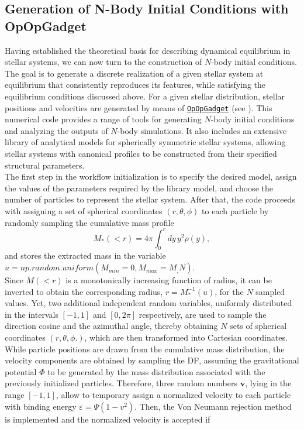 \documentclass[12pt,twoside,openany]{book}
\begin{document}
\subsection{Generation of N-Body Initial Conditions with OpOpGadget}
\label{subsec:Generation of N-Body ICs with OpOpGadget}
Having established the theoretical basis for describing dynamical equilibrium in stellar systems, we can now turn to the construction of $N$-body initial conditions. The goal is to generate a discrete realization of a given stellar system at equilibrium that consistently reproduces its features, while satisfying the equilibrium conditions discussed above. For a given stellar distribution, stellar positions and velocities are generated by means of \href{https://github.com/giulianoiorio/OpOpGadget}{\texttt{OpOpGadget}} (see \citealt{Iorio_2019}). This numerical code provides a range of tools for generating $N$-body initial conditions and analyzing the outputs of $N$-body simulations. It also includes an extensive library of analytical models for spherically symmetric stellar systems, allowing stellar systems with canonical profiles to be constructed from their specified structural parameters.\\The first step in the workflow initialization is to specify the desired model, assign the values of the parameters required by the library model, and choose the number of particles to represent the stellar system. After that, the code proceeds with assigning a set of spherical coordinates $(r,\theta,\phi)$ to each particle by randomly sampling the cumulative mass profile
\begin{equation}\label{cumulative mass formula}
 M_*(<r)=4\pi\int_0^{r}dy\,y^2\rho(y),
\end{equation}
and stores the extracted mass in the variable $u=np.random.uniform(M_{min}=0, M_{max}=M_, N)$.\\Since $M(<r)$ is a monotonically increasing function of radius, it can be inverted to obtain the corresponding radius, $r=M_*^{-1}(u)$, for the $N$ sampled values. Yet, two additional independent random variables, uniformly distributed in the intervals $[-1,1]$ and $[0,2\pi]$ respectively, are used to sample the direction cosine and the azimuthal angle, thereby obtaining $N$ sets of spherical coordinates $(r,\theta,\phi.)$, which are then transformed into Cartesian coordinates.\\While particle positions are drawn from the cumulative mass distribution, the velocity components are obtained by sampling the DF, assuming the gravitational potential $\Phi$ to be generated by the mass distribution associated with the previously initialized particles. Therefore, three random numbers $\mathbf{v}$, lying in the range $[-1,1]$, allow to temporary assign a normalized velocity to each particle with binding energy $\varepsilon=\Psi(1-v^2)$. Then, the Von Neumann rejection method is implemented and the normalized velocity is accepted if
\end{document}
